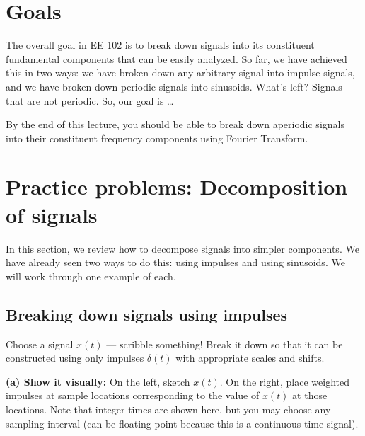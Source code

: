 

\section{Goals}
The overall goal in EE 102 is to break down signals into its constituent fundamental components that can be easily analyzed. So far, we have achieved this in two ways: we have broken down any arbitrary signal into impulse signals, and we have broken down periodic signals into sinusoids. What's left? Signals that are not periodic. So, our goal is \dots 

By the end of this lecture, you should be able to break down aperiodic signals into their constituent frequency components using Fourier Transform.
\section{Practice problems: Decomposition of signals}
In this section, we review how to decompose signals into simpler components. We have already seen two ways to do this: using impulses and using sinusoids. We will work through one example of each. 
\subsection{Breaking down signals using impulses}
Choose a signal $x(t)$ --- scribble something! Break it down so that it can be constructed using only impulses $\delta(t)$ with appropriate scales and shifts.

\medskip
\textbf{(a) Show it visually: } On the left, sketch $x(t)$. On the right, place weighted impulses at sample locations corresponding to the value of $x(t)$ at those locations. Note that integer times are shown here, but you may choose any sampling interval (can be floating point because this is a continuous-time signal).

\begin{center}
\begin{minipage}{0.47\linewidth}
\end{minipage}\hfill
\begin{minipage}{0.47\linewidth}
\end{minipage}
\end{center}

